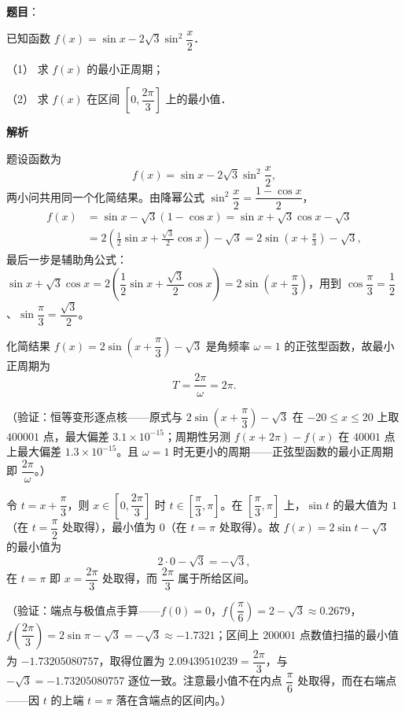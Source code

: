 \begin{answer}

\textbf{题目}：

已知函数 \(f(x)=\sin x-2\sqrt{3}\sin^{2}\dfrac{x}{2}\)．

（1） 求 \(f(x)\) 的最小正周期；

（2） 求 \(f(x)\) 在区间 \(\left[0,\dfrac{2\pi}{3}\right]\) 上的最小值．

\textbf{解析}

题设函数为
\nopagebreak[4]
\[
f(x)=\sin x-2\sqrt{3}\sin^{2}\frac{x}{2},
\]
两小问共用同一个化简结果。由降幂公式 \(\sin^{2}\dfrac{x}{2}=\dfrac{1-\cos x}{2}\)，
\nopagebreak[4]
\[
\begin{aligned}
f(x)&=\sin x-\sqrt{3}(1-\cos x)=\sin x+\sqrt{3}\cos x-\sqrt{3}\\
&=2\left(\frac{1}{2}\sin x+\frac{\sqrt{3}}{2}\cos x\right)-\sqrt{3}=2\sin\left(x+\frac{\pi}{3}\right)-\sqrt{3},
\end{aligned}
\]
最后一步是辅助角公式：\(\sin x+\sqrt{3}\cos x=2\left(\dfrac{1}{2}\sin x+\dfrac{\sqrt{3}}{2}\cos x\right)=2\sin\left(x+\dfrac{\pi}{3}\right)\)，用到 \(\cos\dfrac{\pi}{3}=\dfrac{1}{2}\)、\(\sin\dfrac{\pi}{3}=\dfrac{\sqrt{3}}{2}\)。


化简结果 \(f(x)=2\sin\left(x+\dfrac{\pi}{3}\right)-\sqrt{3}\) 是角频率 \(\omega=1\) 的正弦型函数，故最小正周期为
\nopagebreak[4]
\[
T=\frac{2\pi}{\omega}=2\pi .
\]

（验证：恒等变形逐点核——原式与 \(2\sin\left(x+\dfrac{\pi}{3}\right)-\sqrt{3}\) 在 \(-20\leqslant x\leqslant20\) 上取 \(400001\) 点，最大偏差 \(3.1\times10^{-15}\)；周期性另测 \(f(x+2\pi)-f(x)\) 在 \(40001\) 点上最大偏差 \(1.3\times10^{-15}\)。且 \(\omega=1\) 时无更小的周期——正弦型函数的最小正周期即 \(\dfrac{2\pi}{\omega}\)。）


令 \(t=x+\dfrac{\pi}{3}\)，则 \(x\in\left[0,\dfrac{2\pi}{3}\right]\) 时 \(t\in\left[\dfrac{\pi}{3},\pi\right]\)。在 \(\left[\dfrac{\pi}{3},\pi\right]\) 上，\(\sin t\) 的最大值为 \(1\)（在 \(t=\dfrac{\pi}{2}\) 处取得），最小值为 \(0\)（在 \(t=\pi\) 处取得）。故 \(f(x)=2\sin t-\sqrt{3}\) 的最小值为
\nopagebreak[4]
\[
2\cdot0-\sqrt{3}=-\sqrt{3},
\]
在 \(t=\pi\) 即 \(x=\dfrac{2\pi}{3}\) 处取得，而 \(\dfrac{2\pi}{3}\) 属于所给区间。

（验证：端点与极值点手算——\(f(0)=0\)，\(f\left(\dfrac{\pi}{6}\right)=2-\sqrt{3}\approx0.2679\)，\(f\left(\dfrac{2\pi}{3}\right)=2\sin\pi-\sqrt{3}=-\sqrt{3}\approx-1.7321\)；区间上 \(200001\) 点数值扫描的最小值为 \(-1.73205080757\)，取得位置为 \(2.09439510239=\dfrac{2\pi}{3}\)，与 \(-\sqrt{3}=-1.73205080757\) 逐位一致。注意最小值不在内点 \(\dfrac{\pi}{6}\) 处取得，而在右端点——因 \(t\) 的上端 \(t=\pi\) 落在含端点的区间内。）



\end{answer}
